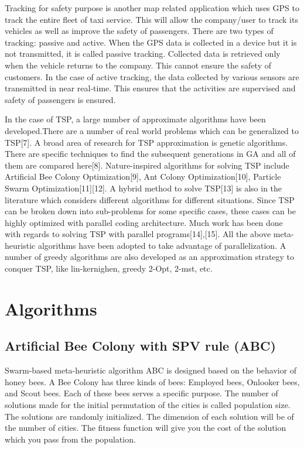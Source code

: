 \documentclass[conference]{IEEEtran}
\begin{document}
Tracking for safety purpose is another map related application which uses GPS to track the entire fleet of taxi service. This will allow the company/user to track its vehicles as well as improve the safety of passengers. There are two types of tracking: passive and active. When the GPS data is collected in a device but it is not transmitted, it is called passive tracking. Collected data is retrieved only when the vehicle returns to the company. This cannot ensure the safety of customers. In the case of active tracking, the data collected by various sensors are transmitted in near real-time. This ensures that the activities are supervised and safety of passengers is ensured.  

In the case of TSP, a large number of approximate algorithms have been developed.There are a number of real world problems which can  be generalized to TSP[7]. A broad area of research for TSP approximation is genetic algorithms. There are specific techniques to find the subsequent generations in GA and all of them are compared here[8]. Nature-inspired algorithms for solving TSP include Artificial Bee Colony Optimization[9], Ant Colony Optimization[10], Particle Swarm Optimization[11][12]. A hybrid method to solve TSP[13] is also in the literature which considers different algorithms for different situations. Since TSP can be broken down into sub-problems for some specific cases, these cases can be highly optimized with parallel coding architecture. Much work has been done with regards to solving TSP with parallel programs[14],[15]. All the above meta-heuristic algorithms have been adopted to take advantage of parallelization. A number of greedy algorithms are also developed as an approximation strategy to conquer TSP, like lin-kernighen, greedy 2-Opt, 2-mst, etc. 


\section{Algorithms}
\subsection {Artificial Bee Colony with SPV rule (ABC)}
Swarm-based meta-heuristic algorithm ABC is designed based on the behavior of honey bees. A Bee Colony has three kinds of bees: Employed bees, Onlooker bees, and Scout bees. Each of these bees serves a specific purpose. The number of solutions made for the initial permutation of the cities is called population size. The solutions are randomly initialized. The dimension of each solution will be of the number of cities. The fitness function will give you the cost of the solution which you pass from the population. 
\end{document}
